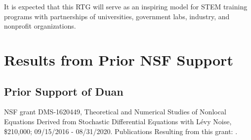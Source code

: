 \documentclass[11pt]{NSFamsart}
\begin{document}
It is expected that this RTG will serve as an inspiring model for STEM  training programs with partnerships of universities, government labs, industry, and nonprofit organizations.

 
\section{Results from Prior NSF Support}

 
  
 
\subsection*{Prior Support of Duan} NSF grant  DMS-1620449, Theoretical and Numerical Studies of Nonlocal Equations Derived from Stochastic Differential Equations with L\'evy Noise, \$210,000; 09/15/2016 - 08/31/2020. Publications Resulting from this grant:
 \cite{ChenWu, ChenXL2020,  DannyTesfay,GaoTing2016, Gao2016,    Liu2019LvyNI, Lv2016OnAS, QiaoDuan2018,Wang2018NumericalAF, YangDuanWiggins2020,ZhangZhuanDuan,ZhengDuan2017,ZhengYY2020}.

 
\end{document}
